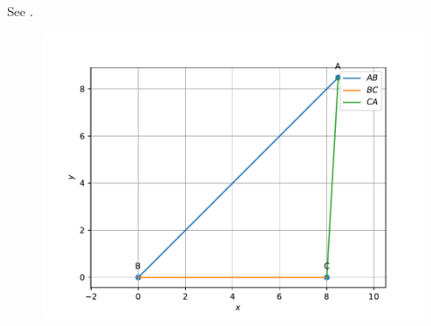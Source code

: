 See .
\begin{figure}[!ht]
 \begin{center}
	 \includegraphics[width=\columnwidth]{chapters/9/11/2/2/figs/vector.pdf}
 \end{center}
 \caption{}
 \label{fig:Fig1}
\end{figure}
